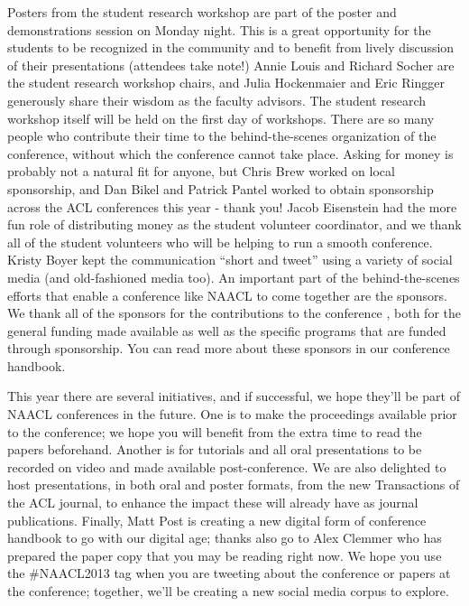 \documentclass[11pt]{article}
\begin{document}
Posters from the student research workshop are part of the poster and demonstrations session on Monday night. This is a great opportunity for the students to be recognized in the community and to benefit from lively discussion of their presentations (attendees take note!) Annie Louis and Richard Socher are the student research workshop chairs, and Julia Hockenmaier and Eric Ringger generously share their wisdom as the faculty advisors.  The student research workshop itself will be held on the first day of workshops.
There are so many people who contribute their time to the behind-the-scenes organization of the conference, without which the conference cannot take place. Asking for money is probably not a natural fit for anyone, but Chris Brew worked on local sponsorship, and Dan Bikel and Patrick Pantel worked to obtain sponsorship across the ACL conferences this year - thank you!  Jacob Eisenstein had the more fun role of distributing money as the student volunteer coordinator, and we thank all of the student volunteers who will be helping to run a smooth conference.  Kristy Boyer kept the communication ``short and tweet'' using a variety of social media (and old-fashioned media too).
An important part of the behind-the-scenes efforts that enable a conference like NAACL to come together are the sponsors. We thank all of the sponsors for the contributions to the conference , both for the general funding made available as well as the specific programs that are funded through sponsorship.  You can read more about these sponsors in our conference handbook.

This year there are several initiatives, and if successful, we hope  they’ll be part of NAACL conferences in the future. One is to make the proceedings available prior to the conference; we hope you will benefit from the extra time to read the papers beforehand.  Another is for tutorials and all oral presentations to be recorded on video and made available post-conference. We are also delighted to host presentations, in both oral and poster formats, from the new Transactions of the ACL journal, to enhance the impact these will already have as journal publications. Finally, Matt Post is creating a new digital form of conference handbook to go with our digital age; thanks also go to  Alex Clemmer who  has prepared the paper copy that you may be reading right now.  We hope you use the \#NAACL2013 tag when you are tweeting about the conference or papers at the conference; together, we'll be creating a new social media corpus to explore.
\end{document}
